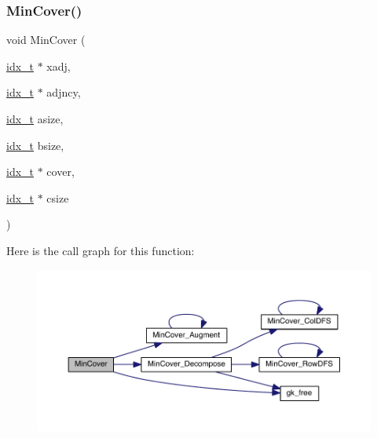 \subsubsection{\texorpdfstring{Min\+Cover()}{MinCover()}}
{\footnotesize\ttfamily void Min\+Cover (\begin{DoxyParamCaption}\item[{\hyperlink{a00876_aaa5262be3e700770163401acb0150f52}{idx\+\_\+t} $\ast$}]{xadj,  }\item[{\hyperlink{a00876_aaa5262be3e700770163401acb0150f52}{idx\+\_\+t} $\ast$}]{adjncy,  }\item[{\hyperlink{a00876_aaa5262be3e700770163401acb0150f52}{idx\+\_\+t}}]{asize,  }\item[{\hyperlink{a00876_aaa5262be3e700770163401acb0150f52}{idx\+\_\+t}}]{bsize,  }\item[{\hyperlink{a00876_aaa5262be3e700770163401acb0150f52}{idx\+\_\+t} $\ast$}]{cover,  }\item[{\hyperlink{a00876_aaa5262be3e700770163401acb0150f52}{idx\+\_\+t} $\ast$}]{csize }\end{DoxyParamCaption})}

Here is the call graph for this function\+:\nopagebreak
\begin{figure}[H]
\begin{center}
\leavevmode
\includegraphics[width=350pt]{a00245_ad53d93ad9bfbd54416b3449971838830_cgraph}
\end{center}
\end{figure}
\mbox{\label{a00245_ad4fd2d52a6465e871ff38851cf443744}} 
